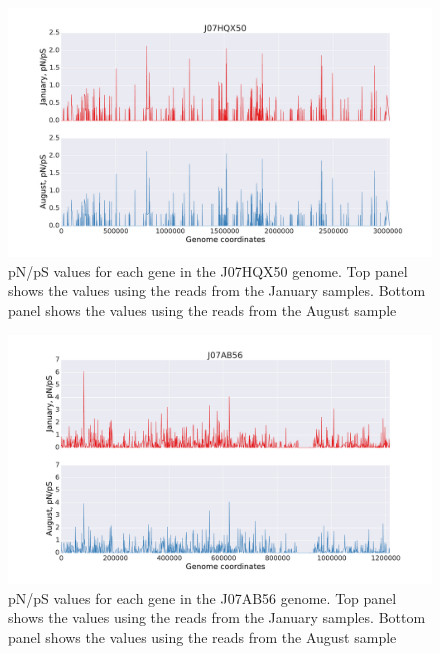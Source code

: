 \begin{figure}[p]
  \centering
  \includegraphics[width=\textwidth,height=\textheight,keepaspectratio]{Chapter5/Figures/pn_ps_plots/J07HQX50_pNpS_density.pdf}
  \caption{pN/pS values for each gene in the J07HQX50 genome. Top panel shows the values using the reads from the January samples. Bottom panel shows the values using the reads from the August sample}
  \label{J07HQX50_pNpS}
\end{figure}

\begin{figure}[p]
  \centering
  \includegraphics[width=\textwidth,height=\textheight,keepaspectratio]{Chapter5/Figures/pn_ps_plots/J07AB56_pNpS_density.pdf}
  \caption{pN/pS values for each gene in the J07AB56 genome. Top panel shows the values using the reads from the January samples. Bottom panel shows the values using the reads from the August sample}
  \label{J07AB56_pNpS}
\end{figure}

